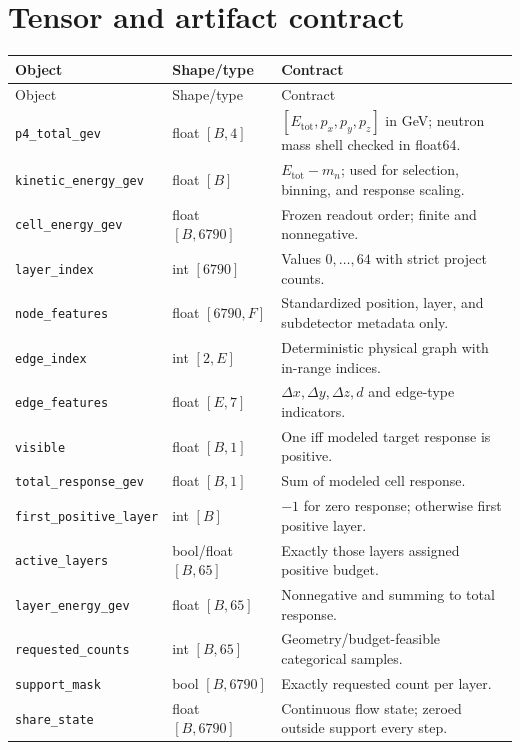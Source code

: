\documentclass[10pt,a4paper]{article}
\newcommand{\Etot}{E_{\mathrm{tot}}}
\begin{document}
\appendix
\section{Tensor and artifact contract}

\begin{longtable}{@{}p{}p{}p{}@{}}
\toprule
Object & Shape/type & Contract \\
\midrule
\endfirsthead
\toprule
Object & Shape/type & Contract \\
\midrule
\endhead
\texttt{p4\_total\_gev} & float $[B,4]$ & $[\Etot,p_x,p_y,p_z]$ in GeV; neutron mass shell checked in float64. \\
\texttt{kinetic\_energy\_gev} & float $[B]$ & $\Etot-m_n$; used for selection, binning, and response scaling. \\
\texttt{cell\_energy\_gev} & float $[B,6790]$ & Frozen readout order; finite and nonnegative. \\
\texttt{layer\_index} & int $[6790]$ & Values $0,\ldots,64$ with strict project counts. \\
\texttt{node\_features} & float $[6790,F]$ & Standardized position, layer, and subdetector metadata only. \\
\texttt{edge\_index} & int $[2,E]$ & Deterministic physical graph with in-range indices. \\
\texttt{edge\_features} & float $[E,7]$ & $\Delta x,\Delta y,\Delta z,d$ and edge-type indicators. \\
\texttt{visible} & float $[B,1]$ & One iff modeled target response is positive. \\
\texttt{total\_response\_gev} & float $[B,1]$ & Sum of modeled cell response. \\
\texttt{first\_positive\_layer} & int $[B]$ & $-1$ for zero response; otherwise first positive layer. \\
\texttt{active\_layers} & bool/float $[B,65]$ & Exactly those layers assigned positive budget. \\
\texttt{layer\_energy\_gev} & float $[B,65]$ & Nonnegative and summing to total response. \\
\texttt{requested\_counts} & int $[B,65]$ & Geometry/budget-feasible categorical samples. \\
\texttt{support\_mask} & bool $[B,6790]$ & Exactly requested count per layer. \\
\texttt{share\_state} & float $[B,6790]$ & Continuous flow state; zeroed outside support every step. \\

\end{longtable}
\end{document}
